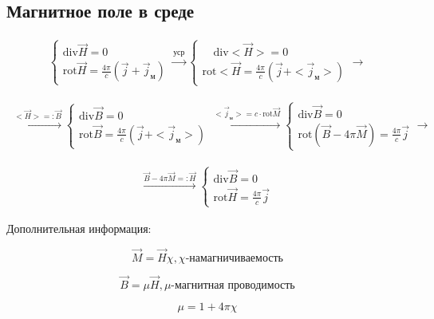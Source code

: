 \subsection*{Магнитное поле в среде}

\[
\begin{aligned}
    \begin{cases}
        \mathrm{div}\vec{H}=0  \\ 
        \mathrm{rot}\vec{H}=\frac{4\pi}{c}(\vec{j}+\vec{j}_{\text{м}})
    \end{cases}
    \overset{\text{уср}}{\rightarrow}
    \begin{cases}
        \quad \mathrm{div}<\vec{H}>=0 \\
        \mathrm{rot}<\vec{H}= \frac{4\pi}{c}(\vec{j}+<\vec{j}_{\text{м}}>)
    \end{cases}
    \rightarrow
\end{aligned}
\]

\[
\begin{aligned}
    \overset{<\vec{H}>=:\vec{B}}{\rightarrow}
    \begin{cases}
        \mathrm{div}\vec{B}=0 \\
        \mathrm{rot}\vec{B}= \frac{4\pi}{c}(\vec{j}+<\vec{j}_{\text{м}}>)
    \end{cases}
    \overset{<\vec{j}_{\text{м}}>=c\cdot \mathrm{rot}\vec{M}}{\rightarrow}
    \begin{cases}
        \mathrm{div}\vec{B}=0 \\
        \mathrm{rot}(\vec{B}-4\pi\vec{M})= \frac{4\pi}{c}\vec{j}
    \end{cases}
    \rightarrow 
\end{aligned}
\]

\[
\begin{aligned}
    \overset{\vec{B}-4\pi\vec{M}=:\vec{H}}{\rightarrow}
    \boxed{\begin{cases}
        \mathrm{div}\vec{B}=0 \\
        \mathrm{rot}\vec{H}= \frac{4\pi}{c}\vec{j}
    \end{cases}
    }
\end{aligned}
\]

Дополнительная информация:

\[
\vec{M}=\vec{H}\chi, \chi \text{-намагничиваемость} 
\]

\[
\vec{B}=\mu \vec{H}, \mu \text{-магнитная проводимость}
\]

\[
\mu=1+4\pi\chi
\]